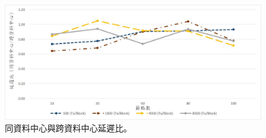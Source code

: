 \begin{figure}[h]
\centering
\includegraphics[scale=0.8]{images/66.jpg}
\caption{同資料中心與跨資料中心延遲比。}
\label{i:byz-latency}
\end{figure}
